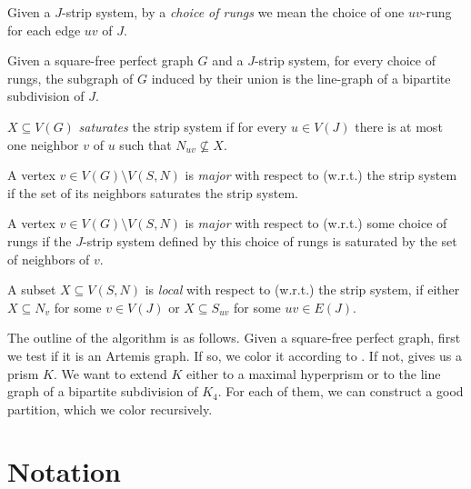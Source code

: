 \begin{defnTwo}
  Given a $J$-strip system, by a \emph{choice of rungs} we mean the choice of one $uv$-rung for each edge $uv$ of $J$.
\end{defnTwo}

Given a square-free perfect graph $G$ and a $J$-strip system, for every choice of rungs, the subgraph of $G$ induced by their union is the line-graph of a bipartite subdivision of $J$.

\begin{defnTwo}
  $X \subseteq V(G)$ \emph{saturates} the strip system if for every $u \in V(J)$ there is at most one neighbor $v$ of $u$ such that $N_{uv} \nsubseteq X$.
\end{defnTwo}

\begin{defnTwo}
  A vertex $v \in V(G) \setminus V(S, N)$  is \emph{major} with respect to (w.r.t.) the strip system if the set of its neighbors saturates the strip system.
\end{defnTwo}

\begin{defnTwo}
  A vertex $v \in V(G) \setminus V(S, N)$  is \emph{major} with respect to (w.r.t.) some choice of rungs if the $J$-strip system defined by this choice of rungs is saturated by the set of neighbors of $v$.
\end{defnTwo}

\begin{defnTwo}
  A subset $X \subseteq V(S, N)$ is \emph{local} with respect to (w.r.t.) the strip system, if either $X \subseteq N_v$ for some $v \in V(J)$ or $X \subseteq S_{uv}$ for some $uv \in E(J)$.
\end{defnTwo}

The outline of the algorithm is as follows. Given a square-free perfect graph, first we test if it is an Artemis graph. If so, we color it according to . If not,  gives us a prism $K$. We want to extend $K$ either to a maximal hyperprism or to the line graph of a bipartite subdivision of $K_4$. For each of them, we can construct a good partition, which we color recursively.

\section{Notation}

